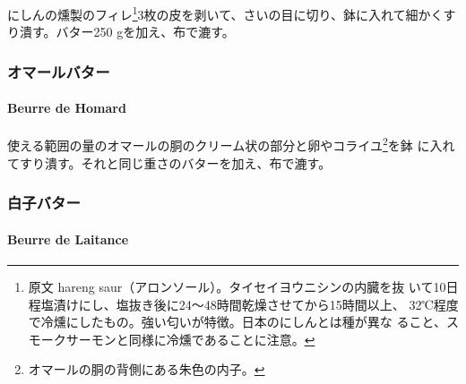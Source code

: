 \begin{recette}
にしんの燻製のフィレ\footnote{原文 hareng
  saur（アロンソール）。タイセイヨウニシンの内臓を抜
  いて10日程塩漬けにし、塩抜き後に24〜48時間乾燥させてから15時間以上、
  32℃程度で冷燻にしたもの。強い匂いが特徴。日本のにしんとは種が異な
  ること、スモークサーモンと同様に冷燻であることに注意。}3枚の皮を剥いて、さいの目に切り、鉢に入れて細かくすり潰す。バター250
gを加え、布で漉す。

\maeaki

\hypertarget{ux30aaux30deux30fcux30ebux30d0ux30bfux30fc}{%
\subsubsection{オマールバター}\label{ux30aaux30deux30fcux30ebux30d0ux30bfux30fc}}

\hypertarget{beurre-de-homard}{%
\paragraph{Beurre de Homard}\label{beurre-de-homard}}


使える範囲の量のオマールの胴のクリーム状の部分と卵やコライユ\footnote{オマールの胴の背側にある朱色の内子。}を鉢
に入れてすり潰す。それと同じ重さのバターを加え、布で漉す。

\maeaki

\hypertarget{ux767dux5b50ux30d0ux30bfux30fc}{%
\subsubsection{白子バター}\label{ux767dux5b50ux30d0ux30bfux30fc}}

\hypertarget{beurre-de-laitance}{%
\paragraph{Beurre de Laitance}\label{beurre-de-laitance}}



\end{recette}
